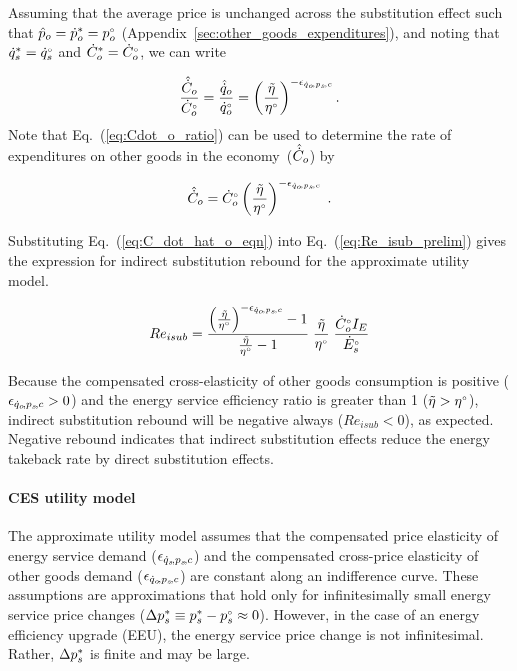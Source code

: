 Assuming that the average price is unchanged across the substitution effect
such that $\hat{p}_o = {\dot{p}}^*_o = {}{p}^{\scriptscriptstyle \circ}_o$
(Appendix~\ref{sec:other_goods_expenditures}),
and noting that ${\dot{q}}^*_s = {}{\dot{q}}^{\scriptscriptstyle \circ}_s$ and ${\dot{C}}^*_o = {}{\dot{C}}^{\scriptscriptstyle \circ}_o$,
we can write

\begin{equation} \label{eq:Cdot_o_ratio}
  \frac{\hat{\dot{C}}_o}{{}{\dot{C}}^{\scriptscriptstyle \circ}_o}
      = \frac{\hat{\dot{q}}_o}{{}{\dot{q}}^{\scriptscriptstyle \circ}_o}
      = \left( \frac{\tilde{\eta}}{{}{\eta}^{\scriptscriptstyle \circ}} \right)^{-\epsilon_{\dot{q}_o\!,p_s\!,c}} .
\end{equation}
%
Note that Eq.~(\ref{eq:Cdot_o_ratio})
can be used to determine the rate of expenditures
on other goods in the economy~($\hat{\dot{C}}_o$) by

\begin{equation} \label{eq:C_dot_hat_o_eqn}
  \hat{\dot{C}}_o = {}{\dot{C}}^{\scriptscriptstyle \circ}_o \left( \frac{\tilde{\eta}}{{}{\eta}^{\scriptscriptstyle \circ}} \right)^{-\epsilon_{\dot{q}_o\!,p_s\!,c}} \; .
\end{equation}

Substituting Eq.~(\ref{eq:C_dot_hat_o_eqn}) into Eq.~(\ref{eq:Re_isub_prelim})
gives the expression for 
indirect substitution rebound for the approximate utility model.

\begin{equation}
  Re_{isub} = \frac{{\left( \frac{\tilde{\eta}}{{}{\eta}^{\scriptscriptstyle \circ}} \right)} ^{-\epsilon_{\dot{q}_o\!,p_s\!,c}} - 1}{\frac{\tilde{\eta}}{{}{\eta}^{\scriptscriptstyle \circ}} - 1} \; \frac{\tilde{\eta}}{{}{\eta}^{\scriptscriptstyle \circ}} \; \frac{{}{\dot{C}}^{\scriptscriptstyle \circ}_o I_E}{{}{\dot{E}}^{\scriptscriptstyle \circ}_s}{}
\end{equation}

Because the compensated cross-elasticity of other goods consumption is positive ($\epsilon_{\dot{q}_o\!,p_s\!,c} > 0$) and
the energy service efficiency ratio is greater than 1 ($\tilde{\eta} > {}{\eta}^{\scriptscriptstyle \circ}$),
indirect substitution rebound will be negative always ($Re_{isub} < 0$),
as expected.
Negative rebound indicates that indirect substitution effects 
reduce the energy takeback rate by direct substitution effects.


\paragraph{CES utility model}
\label{sec:Resub_exact_method}

The approximate utility model assumes that 
the compensated price elasticity of energy service demand ($\epsilon_{\dot{q}_s\!,p_s\!,c}$) and
the compensated cross-price elasticity of other goods demand ($\epsilon_{\dot{q}_o\!,p_s\!,c}$)
are constant along an indifference curve.
These assumptions are approximations that hold only 
for infinitesimally small energy service price changes 
($\Delta {p}^*_s \equiv {p}^*_s - {}{p}^{\scriptscriptstyle \circ}_s \approx 0$).
However, in the case of an energy efficiency upgrade (EEU), 
the energy service price change is not infinitesimal.
Rather, 
$\Delta {p}^*_s$ is finite and may be large.

